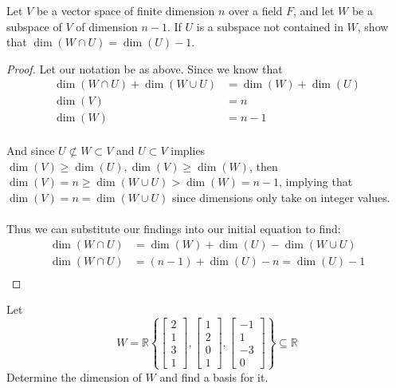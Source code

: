 \documentclass{article}
\begin{document}
\setcounter{problem}{201}
\begin{problem}\label{p202}
Let $V$ be a vector space of finite dimension $n$ over a field $F$, and let $W$ be a subspace of $V$ of dimension $n-1$. If $U$ is a subspace not contained in $W$, show that $\dim(W\cap U) = \dim(U)-1$.
\end{problem}

\begin{solution}\begin{proof}
Let our notation be as above. Since we know that 
\begin{align*}
\dim(W\cap U) + \dim(W\cup U)&= \dim(W) +\dim(U)\\
\dim(V) &= n\\
\dim(W) &= n-1
\end{align*}

\paragraph{}
And since $U\not\subset W\subset V$ and $U\subset V$ implies $\dim(V)\ge\dim(U),\dim(V)\ge\dim(W)$, then $\dim(V) = n \ge \dim(W\cup U) > \dim(W)=n-1$, 
implying that $\dim(V) = n = \dim(W\cup U)$ since dimensions only take on integer values.

\paragraph{}
Thus we can substitute our findings into our initial equation to find:
\begin{align*}
\dim(W\cap U) &= \dim(W) +\dim(U) -\dim(W\cup U)\\
\dim(W\cap U) &= (n-1) +\dim(U) -n = \dim(U)-1\\
\end{align*}
\end{proof}
\end{solution}

\setcounter{problem}{204}
\begin{problem}
Let \[W = \mathbb{R}
\left\{
\begin{bmatrix}
2\\
1\\
3\\
1
\end{bmatrix},
\begin{bmatrix}
1\\
2\\
0\\
1
\end{bmatrix},
\begin{bmatrix}
-1\\
1\\
-3\\
0
\end{bmatrix}
\right\} \subseteq \mathbb{R}
\]
Determine the dimension of $W$ and find a basis for it.
\end{problem}
\end{document}
